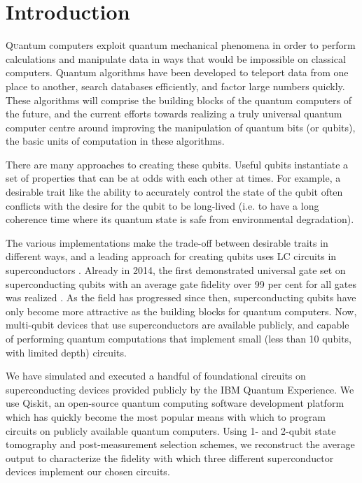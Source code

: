 \section{Introduction}

\lettrine[nindent=0em,lines=3]{Q} uantum computers exploit quantum mechanical
phenomena in order to perform calculations and manipulate data in ways that
would be impossible on classical computers. Quantum algorithms have been
developed to teleport data from one place to another, search databases
efficiently, and factor large numbers quickly. These algorithms will comprise
the building blocks of the quantum computers of the future, and the current
efforts towards realizing a truly universal quantum computer centre around
improving the manipulation of quantum bits (or qubits), the basic units of
computation in these algorithms.

There are many approaches to creating these qubits. Useful qubits instantiate a
set of properties that can be at odds with each other at times. For example, a
desirable trait like the ability to accurately control the state of the qubit
often conflicts with the desire for the qubit to be long-lived (i.e. to have a
long coherence time where its quantum state is safe from environmental
degradation).

The various implementations make the trade-off between desirable traits in
different ways, and a leading approach for creating qubits uses LC circuits in
superconductors \cite{kjaergaard19_super_qubit}. Already in 2014, the first
demonstrated universal gate set on superconducting qubits with an average gate
fidelity over 99 per cent for all gates was realized
\cite{barends14_super_quant_circuit_at_surfac}. As the field has progressed
since then, superconducting qubits have only become more attractive as the
building blocks for quantum computers. Now, multi-qubit devices that use
superconductors are available publicly, and capable of performing quantum
computations that implement small (less than 10 qubits, with limited depth)
circuits.

We have simulated and executed a handful of foundational circuits on
superconducting devices provided publicly by the IBM Quantum Experience. We use
Qiskit, an open-source quantum computing software development
platform which has quickly become the most popular means with which to program
circuits on publicly available quantum computers. Using
1- and 2-qubit state tomography and post-measurement selection schemes, we
reconstruct the average output to characterize the fidelity with
which three different superconductor devices implement our chosen circuits.



